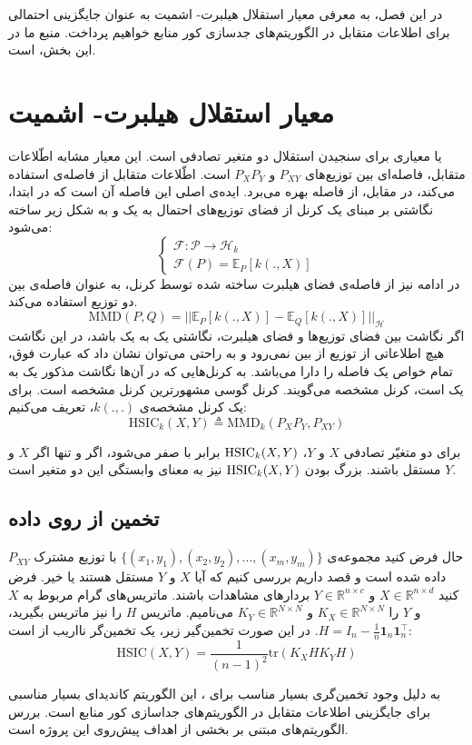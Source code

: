 \label{kernel}
در این فصل، به معرفی  معیار استقلال هیلبرت- اشمیت
\lr{($\HSIC$)}
به عنوان جایگزینی احتمالی برای اطلاعات متقابل در الگوریتم‌های جدسازی کور منابع خواهیم پرداخت. منبع ما در این بخش،
\cite{HSIC}
است.
\section{معیار استقلال هیلبرت- اشمیت
\lr{($\HSIC$)}
}

یا 
\lr{$\HSIC$}
معیاری برای سنجیدن استقلال دو متغیر تصادفی است. این معیار مشابه اطّلاعات متقابل، فاصله‌ای بین توزیع‌های
$P_{XY}$
و 
$P_XP_Y$
است. اطّلاعات متقابل از فاصله‌ی 
استفاده می‌کند، در مقابل،
از فاصله 
بهره می‌برد. ایده‌ی اصلی این فاصله آن است که در ابتدا، نگاشتی بر مبنای یک کرنل از فضای توزیع‌های احتمال به یک 
و به شکل زیر ساخته می‌شود:
\begin{equation}
\begin{cases}
\mathcal{F}: \mathcal{P} \to \mathcal{H}_k\\
\mathcal{F}(P) = \mathbb{E}_{P}\left[ k(., X)\right]
\end{cases}
\end{equation}
در ادامه نیز از فاصله‌ی فضای هیلبرت ساخته شده توسط کرنل، به عنوان فاصله‌ی بین دو توزیع استفاده می‌کند.
\begin{equation}
\mathrm{MMD}(P, Q) = ||{\mathbb{E}_{P}\left[ k(., X)\right] - \mathbb{E}_{Q}\left[ k(., X)\right]}||_\mathcal{H}
\end{equation}
اگر نگاشت بین فضای توزیع‌ها و فضای هیلبرت، نگاشتی یک به یک باشد، در این نگاشت هیچ اطلاعاتی از توزیع از بین نمی‌رود و به راحتی می‌توان نشان داد که عبارت فوق، تمام خواص یک فاصله را دارا می‌باشد. به کرنل‌هایی که در آن‌ها نگاشت مذکور یک به یک است، کرنل مشخصه می‌گویند. کرنل گوسی مشهور‌ترین کرنل مشخصه است. برای یک کرنل مشخصه‌ی 
$k(., .)$،
تعریف می‌کنیم:
\begin{equation}
\mathrm{HSIC}_k(X, Y) \triangleq \mathrm{MMD}_k(P_XP_Y, P_{XY})
\end{equation}

برای دو متغیّر تصادفی 
$X$
و 
$Y$،
$\mathrm{HSIC}_k(X, Y)$
برابر با صفر می‌شود، اگر و تنها اگر $X$ و 
$Y$
مستقل باشند. بزرگ‌‌ بودن $\mathrm{HSIC}_k(X, Y)$
نیز به معنای وابستگی این دو متغیر است.

\subsection{تخمین 
	از روی داده
}
حال فرض کنید مجموعه‌ی 
$\{(x_1, y_1), (x_2, y_2), \dots, (x_m, y_m)\}$
با توزیع مشترک
$P_{XY}$
داده شده است و قصد داریم بررسی کنیم که آیا $X$ و $Y$ مستقل هستند یا خیر. فرض کنید 
$X \in \mathbb{R}^{n\times d}$
و 
$Y \in \mathbb{R}^{n\times c}$
بردارهای مشاهدات باشند. ماتریس‌های گرام مربوط به $X$ و $Y$ را 
$K_X \in \mathbb{R}^{N\times N}$
و 
$K_Y \in \mathbb{R}^{N\times N}$
می‌نامیم. ماتریس $H$ را نیز ماتریس 
بگیرید،
$H = I_n - \frac{1}{n} \mathbf{1}_n\mathbf{1}_n^\top $.
در این صورت تخمین‌گیر زیر، یک تخمین‌گر نااریب از 
است:
$$\mathrm{HSIC}(X, Y) = \frac{1}{(n-1)^2} \mathrm{tr}(K_X H K_Y H)$$

به دلیل وجود تخمین‌گری بسیار مناسب برای 
،
این الگوریتم کاندیدای بسیار  مناسبی برای جایگزینی اطلاعات متقابل در الگوریتم‌های جداسازی کور منابع است. بررس الگوریتم‌های مبتنی بر 
بخشی از اهداف پیش‌روی این پروژه است.
